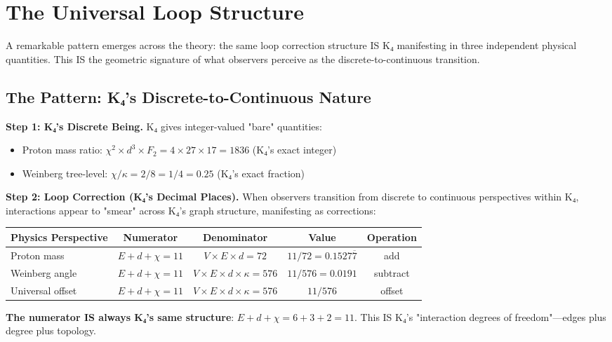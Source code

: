 \documentclass[11pt,a4paper]{book}
\begin{document}
\section{The Universal Loop Structure}

A remarkable pattern emerges across the theory: the same loop correction structure IS K₄ manifesting in three independent physical quantities. This IS the geometric signature of what observers perceive as the discrete-to-continuous transition.

\subsection{The Pattern: K₄'s Discrete-to-Continuous Nature}

\textbf{Step 1: K₄'s Discrete Being.} K₄ gives integer-valued "bare" quantities:
\begin{itemize}
\item Proton mass ratio: $\chi^2 \times d^3 \times F_2 = 4 \times 27 \times 17 = 1836$ (K₄'s exact integer)
\item Weinberg tree-level: $\chi/\kappa = 2/8 = 1/4 = 0.25$ (K₄'s exact fraction)
\end{itemize}

\textbf{Step 2: Loop Correction (K₄'s Decimal Places).} When observers transition from discrete to continuous perspectives within K₄, interactions appear to "smear" across K₄'s graph structure, manifesting as corrections:

\begin{center}
\begin{tabular}{|l|c|c|c|c|}
\hline
\textbf{Physics Perspective} & \textbf{Numerator} & \textbf{Denominator} & \textbf{Value} & \textbf{Operation} \\
\hline
Proton mass & $E+d+\chi = 11$ & $V \times E \times d = 72$ & $11/72 = 0.1527\overline{7}$ & add \\
Weinberg angle & $E+d+\chi = 11$ & $V \times E \times d \times \kappa = 576$ & $11/576 = 0.0191$ & subtract \\
Universal offset & $E+d+\chi = 11$ & $V \times E \times d \times \kappa = 576$ & $11/576$ & offset \\
\hline
\end{tabular}
\end{center}

\textbf{The numerator IS always K₄'s same structure}: $E + d + \chi = 6 + 3 + 2 = 11$. This IS K₄'s "interaction degrees of freedom"—edges plus degree plus topology.
\end{document}
